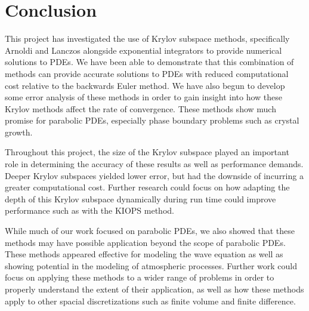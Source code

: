 \section{Conclusion}

This project has investigated the use of Krylov subspace methods, specifically Arnoldi and Lanczos alongside exponential integrators to provide numerical solutions to PDEs.
We have been able to demonstrate that this combination of methods can provide accurate solutions to PDEs with reduced computational cost relative to the backwards Euler method.
We have also begun to develop some error analysis of these methods in order to gain insight into how these Krylov methods affect the rate of convergence.
These methods show much promise for parabolic PDEs, especially phase boundary problems such as crystal growth.

Throughout this project, the size of the Krylov subspace played an important role in determining the accuracy of these results as well as performance demands.
Deeper Krylov subspaces yielded lower error, but had the downside of incurring a greater computational cost.
Further research could focus on how adapting the depth of this Krylov subspace dynamically during run time could improve performance such as with the KIOPS\cite{Gaudreault2018} method.

While much of our work focused on parabolic PDEs, we also showed that these methods may have possible application beyond the scope of parabolic PDEs.
These methods appeared effective for modeling the wave equation as well as showing potential in the modeling of atmospheric processes.
Further work could focus on applying these methods to a wider range of problems in order to properly understand the extent of their application, as well as how these methods apply to other spacial discretizations such as finite volume and finite difference.
